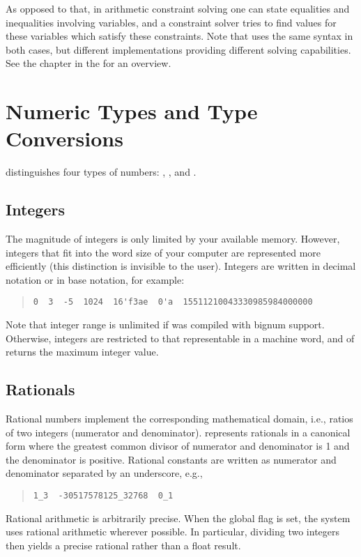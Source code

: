 As opposed to that, in arithmetic constraint solving one can state
equalities and inequalities involving variables, and a constraint
solver tries to find values for these variables which satisfy these
constraints. Note that {\eclipse} uses the same syntax in both cases,
but different implementations providing different solving capabilities.
See the chapter  in the
 for an overview.


\section{Numeric Types and Type Conversions}
{\eclipse} distinguishes four types of numbers: ,
,  and .

\subsection{Integers\label{intrep}}
The magnitude of integers is only limited by your available
memory. However, integers that fit into the word size of your computer are
represented more efficiently (this distinction is invisible to the user).
Integers are written in decimal notation or in base notation, for example:
\begin{quote}
\begin{verbatim}
0  3  -5  1024  16'f3ae  0'a  15511210043330985984000000
\end{verbatim}
\end{quote}

Note that integer range is unlimited if {\eclipse} was compiled with
bignum support. Otherwise, integers are restricted to that representable
in a machine word, and   of
returns the maximum integer value.

\subsection{Rationals}
Rational numbers implement the corresponding mathematical domain,
i.e., ratios of two integers (numerator and denominator).
{\eclipse} represents rationals in a canonical form where the
greatest common divisor of numerator and denominator is 1 and the
denominator is positive. Rational constants are written as numerator
and denominator separated by an underscore, e.g.,
\begin{quote}
\begin{verbatim}
1_3  -30517578125_32768  0_1
\end{verbatim}
\end{quote}
Rational arithmetic is arbitrarily precise. When the global flag
 is set, the system uses rational arithmetic
wherever possible. In particular, dividing two integers then yields a precise
rational rather than a float result.

